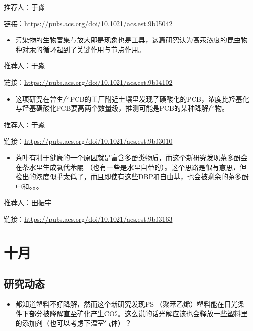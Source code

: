 \documentclass[
]{book}
\providecommand{\tightlist}{%
  \setlength{\itemsep}{0pt}\setlength{\parskip}{0pt}}
\begin{document}
推荐人：于淼

链接：\url{https://pubs.acs.org/doi/10.1021/acs.est.9b05042}

\begin{itemize}
\tightlist
\item
  污染物的生物富集与放大即是现象也是工具，这篇研究认为高汞浓度的昆虫物种对汞的循环起到了关键作用与节点作用。
\end{itemize}

推荐人：于淼

链接：\url{https://pubs.acs.org/doi/10.1021/acs.est.9b04102}

\begin{itemize}
\tightlist
\item
  这项研究在曾生产PCB的工厂附近土壤里发现了磺酸化的PCB，浓度比羟基化与羟基磺酸化PCB要高两个数量级，推测可能是PCB的某种降解产物。
\end{itemize}

推荐人：于淼

链接：\url{https://pubs.acs.org/doi/10.1021/acs.est.9b03010}

\begin{itemize}
\tightlist
\item
  茶叶有利于健康的一个原因就是富含多酚类物质，而这个新研究发现茶多酚会在茶水里生成氯代苯醌 （也有一些是水里自带的）。这个思路是很有意思，但检出的浓度似乎太低了，而且即使有这些DBP和自由基，也会被剩余的茶多酚中和。。。
\end{itemize}

推荐人：田振宇

链接：\url{https://pubs.acs.org/doi/10.1021/acs.est.9b03163}

\hypertarget{ux5341ux6708-1}{%
\section*{十月}\label{ux5341ux6708-1}}

\hypertarget{ux7814ux7a76ux52a8ux6001-23}{%
\subsection*{研究动态}\label{ux7814ux7a76ux52a8ux6001-23}}

\begin{itemize}
\tightlist
\item
  都知道塑料不好降解，然而这个新研究发现PS （聚苯乙烯）塑料能在日光条件下部分被降解直至矿化产生CO2。这么说的话光解应该也会释放一些塑料里的添加剂（也可以考虑下温室气体）？
\end{itemize}
\end{document}
